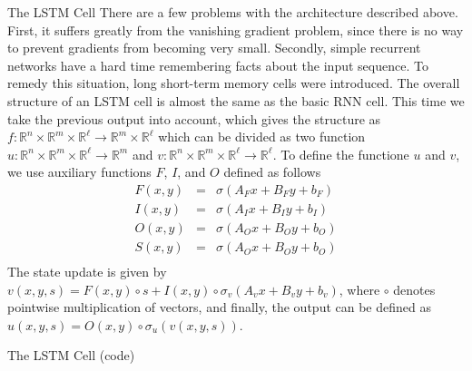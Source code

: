 \documentclass[10pt]{beamer}
\newcommand{\R}{\mathbb{R}}
\begin{document}
\begin{frame}{The LSTM Cell}
  There are a few problems with the architecture described above.  First, it suffers greatly from the vanishing gradient problem, since there is no way to prevent gradients from becoming very small.  Secondly, simple recurrent networks have a hard time remembering facts about the input sequence.  To remedy this situation, long short-term memory cells were introduced.  The overall structure of an LSTM cell is almost the same as the basic RNN cell. This time we take the previous output into account, which gives the structure as $f:\R^n\times \R^m\times \R^{\ell}\to \R^m\times \R^{\ell}$ which can be divided as two function $u:\R^{n}\times\R^m\times \R^{\ell}\to \R^m$ and $v:\R^n\times \R^m\times\R^{\ell}\to \R^{\ell}$. To define the functione $u$ and $v$, we use auxiliary functions $F$, $I$, and $O$ defined as follows
  \begin{eqnarray*}
    F(x, y) &=& \sigma(A_Fx + B_Fy + b_F)\\
    I(x, y) &=& \sigma(A_Ix + B_Iy + b_I)\\
    O(x, y) &=& \sigma(A_Ox + B_Oy + b_O)\\
    S(x, y) &=& \sigma(A_Ox + B_Oy + b_O)\\
  \end{eqnarray*}
  The state update is given by $v(x, y, s) = F(x, y)\circ s + I(x, y)\circ \sigma_v(A_vx + B_vy + b_v)$, where $\circ$ denotes pointwise multiplication of vectors, and finally, the output can be defined as $u(x, y, s)=O(x, y)\circ \sigma_u(v(x, y, s))$.

\end{frame}

\begin{frame}{The LSTM Cell (code)}
\lstI
\end{frame}
\end{document}
